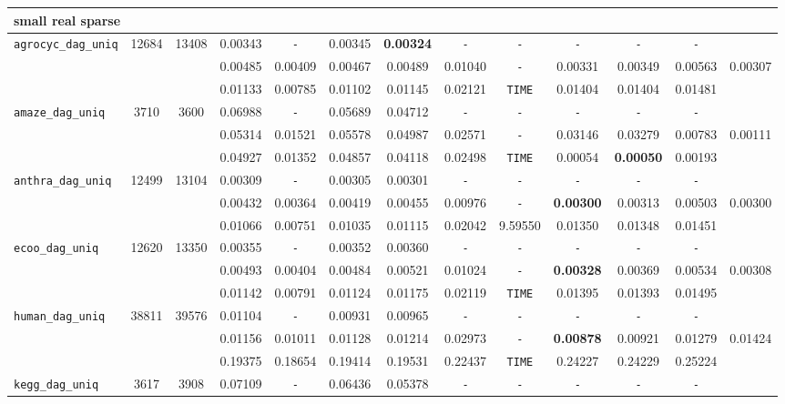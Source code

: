 \begin{table}
{\begin{tabular}{ l c c | c c c c c c c c c || c }
\multicolumn{13}{l}{\textbf{small real sparse}} \\
\hline
\verb|agrocyc_dag_uniq| & 12684 & 13408 & 0.00343 & \verb|-| & 0.00345 & \textbf{0.00324} & \verb|-| & \verb|-| & \verb|-| & \verb|-| & \verb|-| & \\
 &  &  & 0.00485 & 0.00409 & 0.00467 & 0.00489 & 0.01040 & \verb|-| & 0.00331 & 0.00349 & 0.00563 & 0.00307 \\
 &  &  & 0.01133 & 0.00785 & 0.01102 & 0.01145 & 0.02121 & \verb|TIME| & 0.01404 & 0.01404 & 0.01481 & \\
\hline
\verb|amaze_dag_uniq| & 3710 & 3600 & 0.06988 & \verb|-| & 0.05689 & 0.04712 & \verb|-| & \verb|-| & \verb|-| & \verb|-| & \verb|-| & \\
 &  &  & 0.05314 & 0.01521 & 0.05578 & 0.04987 & 0.02571 & \verb|-| & 0.03146 & 0.03279 & 0.00783 & 0.00111 \\
 &  &  & 0.04927 & 0.01352 & 0.04857 & 0.04118 & 0.02498 & \verb|TIME| & 0.00054 & \textbf{0.00050} & 0.00193 & \\
\hline
\verb|anthra_dag_uniq| & 12499 & 13104 & 0.00309 & \verb|-| & 0.00305 & 0.00301 & \verb|-| & \verb|-| & \verb|-| & \verb|-| & \verb|-| & \\
 &  &  & 0.00432 & 0.00364 & 0.00419 & 0.00455 & 0.00976 & \verb|-| & \textbf{0.00300} & 0.00313 & 0.00503 & 0.00300 \\
 &  &  & 0.01066 & 0.00751 & 0.01035 & 0.01115 & 0.02042 & 9.59550 & 0.01350 & 0.01348 & 0.01451 & \\
\hline
\verb|ecoo_dag_uniq| & 12620 & 13350 & 0.00355 & \verb|-| & 0.00352 & 0.00360 & \verb|-| & \verb|-| & \verb|-| & \verb|-| & \verb|-| & \\
 &  &  & 0.00493 & 0.00404 & 0.00484 & 0.00521 & 0.01024 & \verb|-| & \textbf{0.00328} & 0.00369 & 0.00534 & 0.00308 \\
 &  &  & 0.01142 & 0.00791 & 0.01124 & 0.01175 & 0.02119 & \verb|TIME| & 0.01395 & 0.01393 & 0.01495 & \\
\hline
\verb|human_dag_uniq| & 38811 & 39576 & 0.01104 & \verb|-| & 0.00931 & 0.00965 & \verb|-| & \verb|-| & \verb|-| & \verb|-| & \verb|-| & \\
 &  &  & 0.01156 & 0.01011 & 0.01128 & 0.01214 & 0.02973 & \verb|-| & \textbf{0.00878} & 0.00921 & 0.01279 & 0.01424 \\
 &  &  & 0.19375 & 0.18654 & 0.19414 & 0.19531 & 0.22437 & \verb|TIME| & 0.24227 & 0.24229 & 0.25224 & \\
\hline
\verb|kegg_dag_uniq| & 3617 & 3908 & 0.07109 & \verb|-| & 0.06436 & 0.05378 & \verb|-| & \verb|-| & \verb|-| & \verb|-| & \verb|-| & \\

\end{tabular}}
\end{table}

